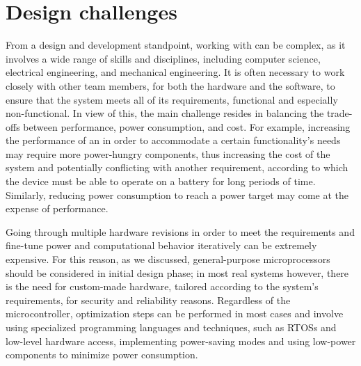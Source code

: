 \section{Design challenges}
From a design and development standpoint, working with \ess can be complex, as it involves a wide range of skills and disciplines, including computer science, electrical engineering, and mechanical engineering. It is often necessary to work closely with other team members, for both the hardware and the software, to ensure that the system meets all of its requirements, functional and especially non-functional. 
In view of this, the main challenge resides in balancing the trade-offs between performance, power consumption, and cost.
For example, increasing the performance of an \es in order to accommodate a certain functionality's needs may require more power-hungry components, thus increasing the cost of the system and potentially conflicting with another requirement, according to which the device must be able to operate on a battery for long periods of time. Similarly, reducing power consumption to reach a power target may come at the expense of performance. 

Going through multiple hardware revisions in order to meet the requirements and fine-tune power and computational behavior iteratively can be extremely expensive. For this reason, as we discussed, general-purpose microprocessors should be considered in initial design phase; in most real systems however, there is the need for custom-made hardware, tailored according to the system's requirements, for security and reliability reasons.
Regardless of the microcontroller, optimization steps can be performed in most cases and involve using specialized programming languages and techniques, such as RTOSs and low-level hardware access, implementing power-saving modes and using low-power components to minimize power consumption.

